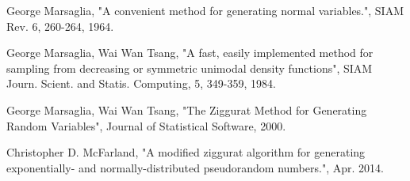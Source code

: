 \documentclass[11pt,onecolumn]{article}
\begin{document}
\newpage
\begin{thebibliography}{9}

	George Marsaglia, "A convenient method for generating normal variables.", SIAM Rev. 6, 260-264, 1964.

	George Marsaglia, Wai Wan Tsang, "A fast, easily implemented method for sampling from decreasing or symmetric unimodal density functions", SIAM Journ. Scient. and Statis. Computing, 5, 349-359, 1984.
	
	George Marsaglia, Wai Wan Tsang, "The Ziggurat Method for Generating Random Variables", Journal of Statistical Software, 2000.

	Christopher D. McFarland, "A modified ziggurat algorithm for generating exponentially- and normally-distributed pseudorandom numbers.", Apr. 2014.

\end{thebibliography}
\end{document}
